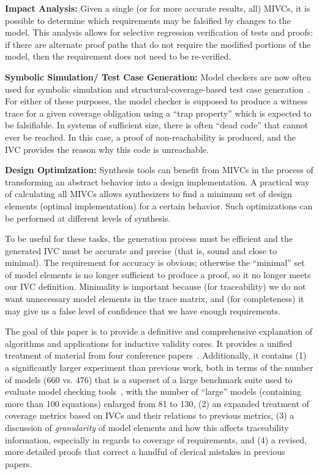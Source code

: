 \noindent \textbf{Impact Analysis:} Given a single (or for more accurate results, all) MIVCs, it is possible to determine which requirements may be falsified by changes to the model.  This analysis allows for selective regression verification of tests and proofs: if there are alternate proof paths that do not require the modified portions of the model, then the requirement does not need to be re-verified.

\noindent \textbf{Symbolic Simulation/ Test Case Generation:} Model checkers are now often used for symbolic simulation and structural-coverage-based test case generation~\cite{SimulinkDesignVerifier,Whalen13:OMCDC}.  For either of these purposes, the model checker is supposed to produce a witness trace for a given coverage obligation using a ``trap property'' which is expected to be falsifiable.  In systems of sufficient size, there is often ``dead code'' that cannot ever be reached.  In this case, a proof of non-reachability is produced, and the IVC provides the reason why this code is unreachable.

\noindent \textbf{Design Optimization:} Synthesis tools can benefit from MIVCs in the process of transforming an abstract behavior into a design implementation. A practical way of calculating all MIVCs allows synthesizers to find a minimum set of design elements (optimal implementation) for a certain behavior. Such optimizations can be performed at different levels of synthesis.

To be useful for these tasks, the generation process must be efficient and the generated IVC must be accurate and precise (that is, sound and close to minimal).  The requirement for accuracy is obvious; otherwise the ``minimal'' set of model elements is no longer sufficient to produce a proof, so it no longer meets our IVC definition.  Minimality is important because (for traceability) we do not want unnecessary model elements in the trace matrix, and (for completeness) it may give us a false level of confidence that we have enough requirements.

The goal of this paper is to provide a definitive and comprehensive explanation of algorithms and applications for inductive validity cores.  It provides a unified treatment of material from four conference papers~\cite{Ghass16,Murugesan16:renext,Ghass17Cov,Ghass17AllIVCs}.  Additionally, it contains (1) a significantly larger experiment than previous work, both in terms of the number of models (660 vs. 476) that is a superset of a large benchmark suite used to evaluate model checking tools~\cite{piskac2016}, with the number of ``large'' models (containing more than 100 equations) enlarged from 81 to 130, (2) an expanded treatment of coverage metrics based on IVCs and their relations to previous metrics, (3) a discussion of {\em granularity} of model elements and how this affects traceability information, especially in regards to coverage of requirements, and (4) a revised, more detailed proofs that correct a handful of clerical mistakes in previous papers.


